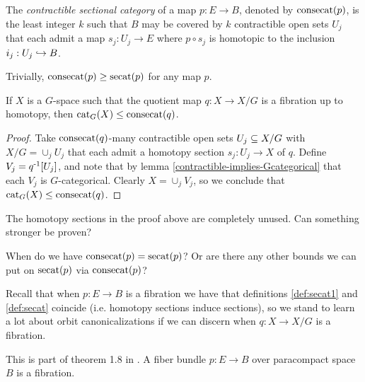 \begin{definition}\label{def:consecat}
    The \emph{contractible sectional category} of a map $p : E \to B$, denoted by $\operatorname{consecat}(p)$, is the least integer $k$ such that $B$ may be covered by $k$ contractible open sets $U_j$ that each admit a map $s_j : U_j \to E$ where $p \circ s_j$ is homotopic to the inclusion $i_j : U_j \hookrightarrow B$.
\end{definition}

\begin{remark}
    Trivially, $\operatorname{consecat}(p) \geq \operatorname{secat}(p)$ for any map $p$.
\end{remark}

\begin{proposition}
    If $X$ is a $G$-space such that the quotient map $q : X \to X/G$ is a fibration up to homotopy, then $\operatorname{cat}_G(X) \leq \operatorname{consecat}(q)$.
    \begin{proof}
        Take $\operatorname{consecat}(q)$-many contractible open sets $U_j \subseteq X/G$ with $X/G = \cup_j U_j$ that each admit a homotopy section $s_j : U_j \to X$ of $q$.
        Define $V_j = q^{\text{-}1}[U_j]$, and note that by lemma \ref{contractible-implies-Gcategorical} that each $V_j$ is $G$-categorical.
        Clearly $X = \cup_j V_j$, so we conclude that $\operatorname{cat}_G(X) \leq \operatorname{consecat}(q)$.
    \end{proof}
\end{proposition}

\begin{question}
    The homotopy sections in the proof above are completely unused.
    Can something stronger be proven?
\end{question}

\begin{question}
    When do we have $\operatorname{consecat}(p) = \operatorname{secat}(p)$?
    Or are there any other bounds we can put on $\operatorname{secat}(p)$ via $\operatorname{consecat}(p)$?
\end{question}

Recall that when $p : E \to B$ is a fibration we have that definitions \ref{def:secat1} and \ref{def:secat} coincide (i.e. homotopy sections induce sections), so we stand to learn a lot about orbit canonicalizations if we can discern when $q : X \to X/G$ is a fibration.

\begin{theorem}
    This is part of theorem 1.8 in \cite{rainer2006orbitprojectionsfibrations}.
    A fiber bundle $p : E \to B$ over paracompact space $B$ is a fibration.
\end{theorem}